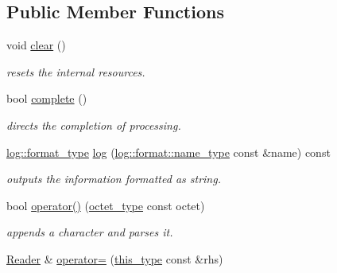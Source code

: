 \subsection*{Public Member Functions}
\begin{DoxyCompactItemize}
\item 
\hypertarget{classhryky_1_1ip_1_1v6_1_1_reader_a9a5a5d6d56bf2aa0db29a32bf24a7ae0}{void \hyperlink{classhryky_1_1ip_1_1v6_1_1_reader_a9a5a5d6d56bf2aa0db29a32bf24a7ae0}{clear} ()}\label{classhryky_1_1ip_1_1v6_1_1_reader_a9a5a5d6d56bf2aa0db29a32bf24a7ae0}

\begin{DoxyCompactList}\small\item\em resets the internal resources. \end{DoxyCompactList}\item 
\hypertarget{classhryky_1_1ip_1_1v6_1_1_reader_aecdc69f1445c85d24fd2d3cf2cccbf91}{bool \hyperlink{classhryky_1_1ip_1_1v6_1_1_reader_aecdc69f1445c85d24fd2d3cf2cccbf91}{complete} ()}\label{classhryky_1_1ip_1_1v6_1_1_reader_aecdc69f1445c85d24fd2d3cf2cccbf91}

\begin{DoxyCompactList}\small\item\em directs the completion of processing. \end{DoxyCompactList}\item 
\hypertarget{classhryky_1_1ip_1_1v6_1_1_reader_a661094a828d644cad86ff199c8e3acad}{\hyperlink{namespacehryky_1_1log_ad50448c3f934f1eacd5c1bcffe8111e1}{log\-::format\-\_\-type} \hyperlink{classhryky_1_1ip_1_1v6_1_1_reader_a661094a828d644cad86ff199c8e3acad}{log} (\hyperlink{namespacehryky_1_1log_1_1format_ab7408d1e2ed2d648dbf9bba69eb74288}{log\-::format\-::name\-\_\-type} const \&name) const }\label{classhryky_1_1ip_1_1v6_1_1_reader_a661094a828d644cad86ff199c8e3acad}

\begin{DoxyCompactList}\small\item\em outputs the information formatted as string. \end{DoxyCompactList}\item 
\hypertarget{classhryky_1_1ip_1_1v6_1_1_reader_a3da067ecff6a1484ae557bd1d15d677f}{bool \hyperlink{classhryky_1_1ip_1_1v6_1_1_reader_a3da067ecff6a1484ae557bd1d15d677f}{operator()} (\hyperlink{namespacehryky_a488cba8b666be33ccca70e819684e3c8}{octet\-\_\-type} const octet)}\label{classhryky_1_1ip_1_1v6_1_1_reader_a3da067ecff6a1484ae557bd1d15d677f}

\begin{DoxyCompactList}\small\item\em appends a character and parses it. \end{DoxyCompactList}\item 
\hypertarget{classhryky_1_1ip_1_1v6_1_1_reader_a8e0b94de1ac741160b3ee947ac678fe2}{\hyperlink{classhryky_1_1ip_1_1v6_1_1_reader}{Reader} \& \hyperlink{classhryky_1_1ip_1_1v6_1_1_reader_a8e0b94de1ac741160b3ee947ac678fe2}{operator=} (\hyperlink{classhryky_1_1ip_1_1v6_1_1_reader_a8e77e03500cfbbc0da2b0bc14f30c0d8}{this\-\_\-type} const \&rhs)}\label{classhryky_1_1ip_1_1v6_1_1_reader_a8e0b94de1ac741160b3ee947ac678fe2}


\end{DoxyCompactItemize}
